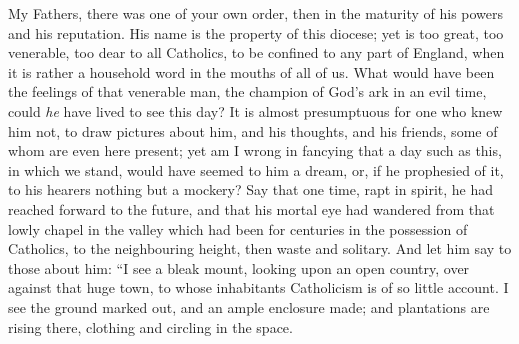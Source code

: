 My Fathers, there was one of your own order, then in
the maturity of his powers and his reputation. His name
is the property of this diocese; yet is too great, too
venerable, too dear to all Catholics, to be confined to
any part of England, when it is rather a household word
in the mouths of all of us. What would have been the
feelings of that venerable man, the champion of God's ark
in an evil time, could \emph{he} have lived to see this
day? It is almost presumptuous for one who knew him not,
to draw pictures about him, and his thoughts, and his
friends, some of whom are even here present; yet am I
wrong in fancying that a day such as this, in which we
stand, would have seemed to him a dream, or, if he
prophesied of it, to his hearers nothing but a mockery?
Say that one time, rapt in spirit, he had reached forward
to the future, and that his mortal eye had wandered from
that lowly chapel in the valley which had been for
centuries in the possession of Catholics, to the
neighbouring height, then waste and solitary. And let him
say to those about him: ``I see a bleak mount,
looking upon an open country, over against that huge
town, to whose inhabitants Catholicism is of so little
account. I see the ground marked out, and an ample
enclosure made; and plantations are rising there,
clothing and circling in the space.

